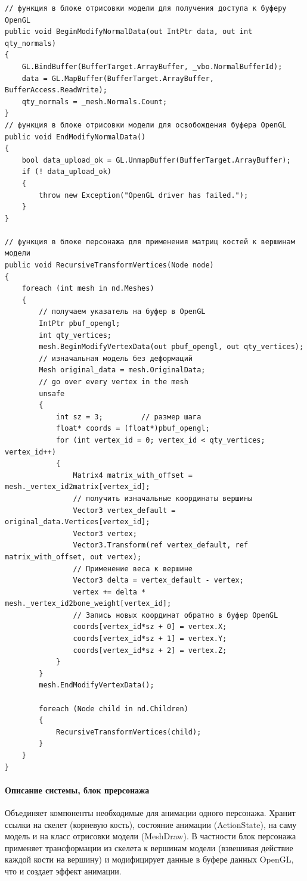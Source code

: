 \begin{verbatim}
// функция в блоке отрисовки модели для получения доступа к буферу OpenGL
public void BeginModifyNormalData(out IntPtr data, out int qty_normals)
{
    GL.BindBuffer(BufferTarget.ArrayBuffer, _vbo.NormalBufferId);
    data = GL.MapBuffer(BufferTarget.ArrayBuffer, BufferAccess.ReadWrite);
    qty_normals = _mesh.Normals.Count;
}
// функция в блоке отрисовки модели для освобождения буфера OpenGL
public void EndModifyNormalData()
{
    bool data_upload_ok = GL.UnmapBuffer(BufferTarget.ArrayBuffer);
    if (! data_upload_ok)
    {
        throw new Exception("OpenGL driver has failed.");
    }
}

// функция в блоке персонажа для применения матриц костей к вершинам модели
public void RecursiveTransformVertices(Node node)
{
    foreach (int mesh in nd.Meshes)
    {
        // получаем указатель на буфер в OpenGL
        IntPtr pbuf_opengl;
        int qty_vertices;
        mesh.BeginModifyVertexData(out pbuf_opengl, out qty_vertices);
        // изначальная модель без деформаций
        Mesh original_data = mesh.OriginalData;
        // go over every vertex in the mesh
        unsafe
        {
            int sz = 3;         // размер шага
            float* coords = (float*)pbuf_opengl;
            for (int vertex_id = 0; vertex_id < qty_vertices; vertex_id++)
            {
                Matrix4 matrix_with_offset = mesh._vertex_id2matrix[vertex_id];
                // получить изначальные координаты вершины
                Vector3 vertex_default = original_data.Vertices[vertex_id];
                Vector3 vertex;
                Vector3.Transform(ref vertex_default, ref matrix_with_offset, out vertex);
                // Применение веса к вершине
                Vector3 delta = vertex_default - vertex;
                vertex += delta *  mesh._vertex_id2bone_weight[vertex_id];
                // Запись новых координат обратно в буфер OpenGL
                coords[vertex_id*sz + 0] = vertex.X;
                coords[vertex_id*sz + 1] = vertex.Y;
                coords[vertex_id*sz + 2] = vertex.Z;
            }
        }
        mesh.EndModifyVertexData();

        foreach (Node child in nd.Children)
        {
            RecursiveTransformVertices(child);
        }
    }
}
\end{verbatim}


\paragraph{Описание системы, блок прерсонажа}
Объединяет компоненты необходимые для анимации одного персонажа. Хранит ссылки на скелет (корневую кость), состояние анимации (ActionState), на саму модель и на класс отрисовки модели (MeshDraw).
    \medskip
    В частности блок персонажа применяет трансформации из скелета к вершинам модели (взвешивая действие каждой кости на вершину) и модифицирует данные в буфере данных OpenGL, что и создает эффект анимации.


